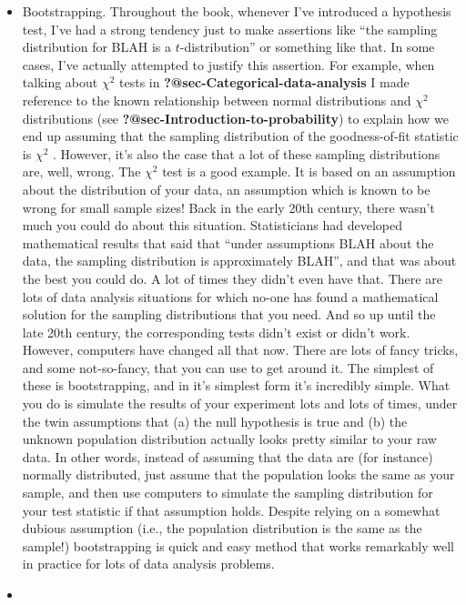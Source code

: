 \documentclass[
  a4paper,
]{book}
\begin{document}
\begin{itemize}
\item
  Bootstrapping. Throughout the book, whenever I've introduced a
  hypothesis test, I've had a strong tendency just to make assertions
  like ``the sampling distribution for BLAH is a \(t\)-distribution'' or
  something like that. In some cases, I've actually attempted to justify
  this assertion. For example, when talking about \(\chi^2\) tests in
  \textbf{?@sec-Categorical-data-analysis} I made reference to the known
  relationship between normal distributions and \(\chi^2\) distributions
  (see \textbf{?@sec-Introduction-to-probability}) to explain how we end
  up assuming that the sampling distribution of the goodness-of-fit
  statistic is \(\chi^2\) . However, it's also the case that a lot of
  these sampling distributions are, well, wrong. The \(\chi^2\) test is
  a good example. It is based on an assumption about the distribution of
  your data, an assumption which is known to be wrong for small sample
  sizes! Back in the early 20th century, there wasn't much you could do
  about this situation. Statisticians had developed mathematical results
  that said that ``under assumptions BLAH about the data, the sampling
  distribution is approximately BLAH'', and that was about the best you
  could do. A lot of times they didn't even have that. There are lots of
  data analysis situations for which no-one has found a mathematical
  solution for the sampling distributions that you need. And so up until
  the late 20th century, the corresponding tests didn't exist or didn't
  work. However, computers have changed all that now. There are lots of
  fancy tricks, and some not-so-fancy, that you can use to get around
  it. The simplest of these is bootstrapping, and in it's simplest form
  it's incredibly simple. What you do is simulate the results of your
  experiment lots and lots of times, under the twin assumptions that (a)
  the null hypothesis is true and (b) the unknown population
  distribution actually looks pretty similar to your raw data. In other
  words, instead of assuming that the data are (for instance) normally
  distributed, just assume that the population looks the same as your
  sample, and then use computers to simulate the sampling distribution
  for your test statistic if that assumption holds. Despite relying on a
  somewhat dubious assumption (i.e., the population distribution is the
  same as the sample!) bootstrapping is quick and easy method that works
  remarkably well in practice for lots of data analysis problems.
\item

\end{itemize}
\end{document}
